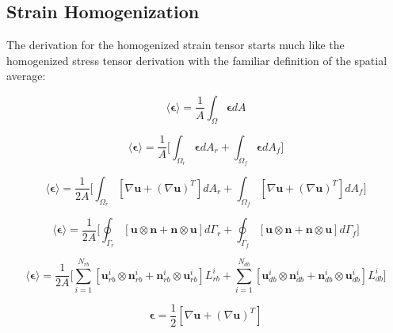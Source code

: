 \subsection{Strain Homogenization}
The derivation for the homogenized strain tensor starts much like the homogenized stress tensor derivation with the familiar definition of the spatial average:

\begin{equation}
\label{eqn:strain2}
\langle \boldsymbol{\epsilon} \rangle = 
\frac{1}{A} \int_\Omega \boldsymbol{\epsilon} { dA}
\end{equation}

\begin{equation}
\label{eqn:strain3}
\langle \boldsymbol{\epsilon} \rangle = 
\frac{1}{A} \bigg \lbrack {\int_{\Omega_{r}} \boldsymbol{\epsilon} { dA_r} + 
\int_{\Omega_{f}} \boldsymbol{\epsilon} { dA_f}} \bigg \rbrack
\end{equation}

\begin{equation}
\label{eqn:strain4}
\langle \boldsymbol{\epsilon} \rangle = 
\frac{1}{2 A} \bigg \lbrack {\int_{\Omega_{r}} \left[ \nabla \mathbf{u} + 
\left( \nabla \mathbf{u} \right)^{T} \right] {dA_r} +
\int_{\Omega_{f}} \left[ \nabla \mathbf{u} + 
\left( \nabla \mathbf{u} \right)^{T} \right] { dA_f}} \bigg \rbrack
\end{equation}

\begin{equation}
\label{eqn:strain5}
\langle \boldsymbol{\epsilon} \rangle = 
\frac{1}{2 A} \bigg \lbrack {\oint_{\Gamma_{r}} \left[ \mathbf{u} \otimes \mathbf{n} + 
\mathbf{n} \otimes \mathbf{u} \right] {d \Gamma_r} +
\oint_{\Gamma_{f}} \left[ \mathbf{u} \otimes \mathbf{n} + 
\mathbf{n} \otimes \mathbf{u} \right] { d \Gamma_f}} \bigg \rbrack
\end{equation}

\begin{equation}
\label{eqn:strain6}
\langle \boldsymbol{\epsilon} \rangle = 
\frac{1}{2 A} \bigg \lbrack {\sum_{i=1}^{N_{rb}} \left[ \mathbf{u}_{rb}^i \otimes \mathbf{n}_{rb}^i + 
\mathbf{n}_{rb}^i \otimes \mathbf{u}_{rb}^i \right] {L_{rb}^i} +
\sum_{i=1}^{N_{db}} \left[ \mathbf{u}_{db}^i \otimes \mathbf{n}_{db}^i + 
\mathbf{n}_{db}^i \otimes \mathbf{u}_{db}^i \right] {L_{db}^i}} \bigg \rbrack
\end{equation}






\begin{equation}
\label{eqn:strain1}
\boldsymbol{\epsilon} = 
\frac{1}{2}  \left[ \nabla \mathbf{u} + \left( \nabla \mathbf{u} \right)^{T} \right]
\end{equation}